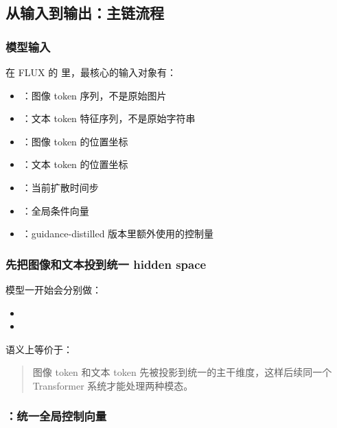 \subsection{从输入到输出：主链流程}

\subsubsection{模型输入}

在 FLUX 的  里，最核心的输入对象有：

\begin{itemize}[leftmargin=1.5em]
  \item {}：图像 token 序列，不是原始图片
  \item {}：文本 token 特征序列，不是原始字符串
  \item {}：图像 token 的位置坐标
  \item {}：文本 token 的位置坐标
  \item {}：当前扩散时间步
  \item {}：全局条件向量
  \item {}：guidance-distilled 版本里额外使用的控制量
\end{itemize}

\subsubsection{先把图像和文本投到统一 hidden space}

模型一开始会分别做：

\begin{itemize}[leftmargin=1.5em]
  \item {}
  \item {}
\end{itemize}

语义上等价于：

\begin{quote}
图像 token 和文本 token 先被投影到统一的主干维度，这样后续同一个 Transformer 系统才能处理两种模态。
\end{quote}

\subsubsection{：统一全局控制向量}

